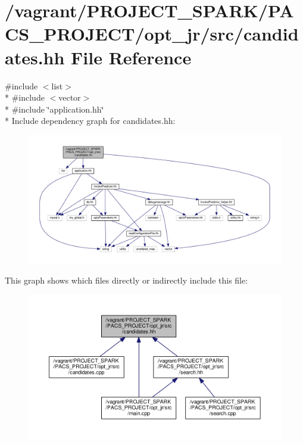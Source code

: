 \hypertarget{candidates_8hh}{\section{/vagrant/\-P\-R\-O\-J\-E\-C\-T\-\_\-\-S\-P\-A\-R\-K/\-P\-A\-C\-S\-\_\-\-P\-R\-O\-J\-E\-C\-T/opt\-\_\-jr/src/candidates.hh File Reference}
\label{candidates_8hh}
}
{\ttfamily \#include $<$list$>$}\\*
{\ttfamily \#include $<$vector$>$}\\*
{\ttfamily \#include \char`\"{}application.\-hh\char`\"{}}\\*
Include dependency graph for candidates.\-hh\-:\nopagebreak
\begin{figure}[H]
\begin{center}
\leavevmode
\includegraphics[width=350pt]{candidates_8hh__incl}
\end{center}
\end{figure}
This graph shows which files directly or indirectly include this file\-:\nopagebreak
\begin{figure}[H]
\begin{center}
\leavevmode
\includegraphics[width=350pt]{candidates_8hh__dep__incl}
\end{center}
\end{figure}
